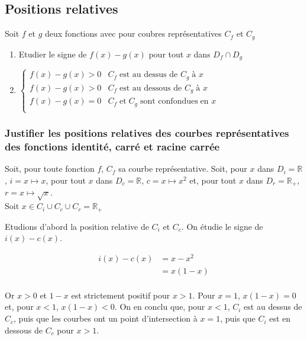 \documentclass{article}
\newcommand{\R}{\mathbb{R}}
\begin{document}
\subsection{Positions relatives}

Soit $f$ et $g$ deux fonctions avec pour coubres représentatives $C_f$ et $C_g$

\begin{enumerate}
	\item Etudier le signe de $f(x) - g(x)$ pour tout $x$ dans $D_f \cap D_g$
	\item $\displaystyle \begin{cases}
			f(x) - g(x) > 0 & C_f \;\text{est au dessus de } C_g \;\text{à }x \\
			f(x) - g(x) > 0 & C_f \;\text{est au dessous de } C_g \;\text{à }x \\
			f(x) - g(x) = 0 & C_f\;\text{et}\;C_g\;\text{sont confondues} \;\text{en }x \\
	\end{cases}$
\end{enumerate}

\subsubsection{Justifier les positions relatives des courbes représentatives des fonctions identité, carré et racine carrée}

Soit, pour toute fonction $f$, $C_f$ sa courbe représentative.
Soit, pour $x$ dans $D_i = \R$, $i = x\mapsto x$, pour tout $x$ dans $D_c = \R$, $c = x\mapsto x^2$ et, pour tout $x$ dans $D_r = \R_+$, $r = x\mapsto \sqrt{x} $.\\

Soit $x \in C_i \cup C_c \cup C_r = \R_+$

Etudions d'abord la position relative de $C_i$ et $C_c$. On étudie le signe de $i(x) - c(x)$.

\begin{align*}
	i(x) - c(x) &= x - x^2 \\
				&= x(1-x) \\
\end{align*}

Or $x > 0$  et $1 - x$ est strictement positif pour $x > 1$. Pour $x = 1$, $x(1-x) = 0$ et, pour $x < 1$, $x(1-x) < 0$. On en conclu que, pour $x < 1$, $C_i$ est au dessus de $C_c$, puis que les courbes ont un point d'intersection à $x = 1$, puis que $C_i$ est en dessous de $C_c$ pour $x > 1$.\\
\end{document}
